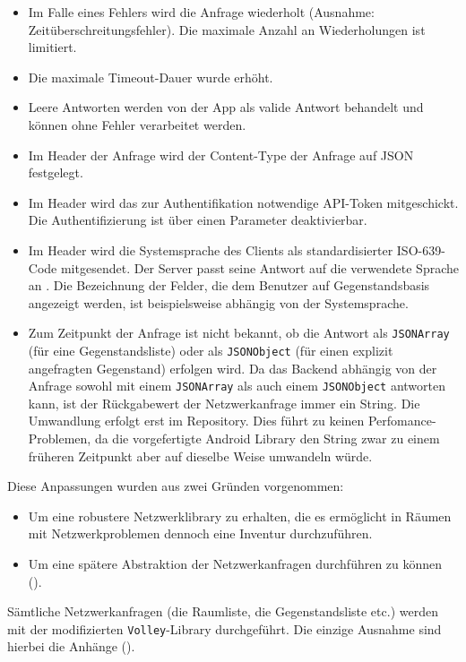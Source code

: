\begin{itemize}
\tightlist
\item
  Im Falle eines Fehlers wird die Anfrage wiederholt (Ausnahme:
  Zeitüberschreitungsfehler). Die maximale Anzahl an Wiederholungen ist
  limitiert.
\item
  Die maximale Timeout-Dauer wurde erhöht.
\item
  Leere Antworten werden von der App als valide Antwort behandelt und
  können ohne Fehler verarbeitet werden.
\item
  Im Header der Anfrage wird der Content-Type der Anfrage auf JSON
  festgelegt.
\item
  Im Header wird das zur Authentifikation notwendige API-Token
  mitgeschickt. Die Authentifizierung ist über einen Parameter
  deaktivierbar.
\item
  Im Header wird die Systemsprache des Clients als standardisierter
  ISO-639-Code mitgesendet. Der Server passt seine Antwort auf die
  verwendete Sprache an \cite{ISO-639}. Die Bezeichnung der Felder, die
  dem Benutzer auf Gegenstandsbasis angezeigt werden, ist beispielsweise
  abhängig von der Systemsprache.
\item
  Zum Zeitpunkt der Anfrage ist nicht bekannt, ob die Antwort als
  \texttt{JSONArray} (\zB für eine Gegenstandsliste) oder als
  \texttt{JSONObject} (\zB für einen explizit angefragten Gegenstand)
  erfolgen wird. Da das Backend abhängig von der Anfrage sowohl mit
  einem \texttt{JSONArray} als auch einem \texttt{JSONObject} antworten
  kann, ist der Rückgabewert der Netzwerkanfrage immer ein String. Die
  Umwandlung erfolgt erst im Repository. Dies führt zu keinen
  Perfomance-Problemen, da die vorgefertigte Android Library den String
  zwar zu einem früheren Zeitpunkt aber auf dieselbe Weise umwandeln
  würde.
\end{itemize}

Diese Anpassungen wurden aus zwei Gründen vorgenommen:

\begin{itemize}
\tightlist
\item
  Um eine robustere Netzwerklibrary zu erhalten, die es ermöglicht in
  Räumen mit Netzwerkproblemen dennoch eine Inventur durchzuführen.
\item
  Um eine spätere Abstraktion der Netzwerkanfragen durchführen zu können
  ().
\end{itemize}

Sämtliche Netzwerkanfragen (die Raumliste, die Gegenstandsliste etc.)
werden mit der modifizierten \texttt{Volley}-Library durchgeführt. Die
einzige Ausnahme sind hierbei die Anhänge ().

